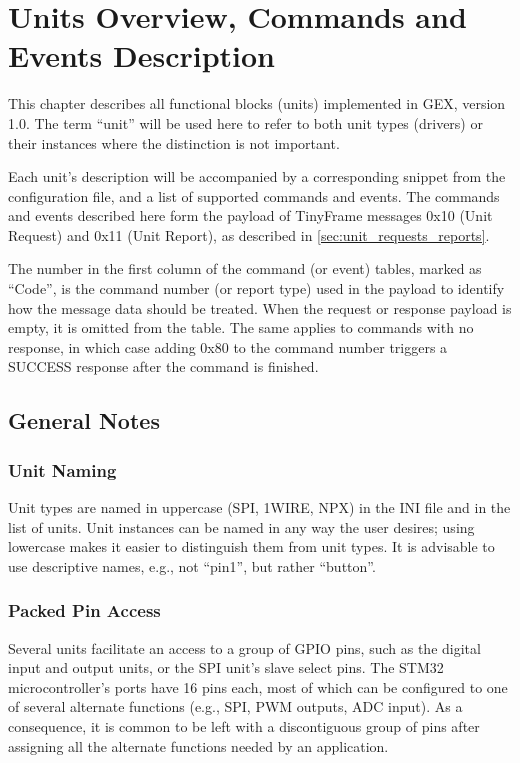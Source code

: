 \chapter{Units Overview, Commands and Events Description} \label{sec:units_overview}

This chapter describes all functional blocks (units) implemented in GEX, version 1.0. The term ``unit'' will be used here to refer to both unit types (drivers) or their instances where the distinction is not important.

Each unit's description will be accompanied by a corresponding snippet from the configuration file, and a list of supported commands and events. The commands and events described here form the payload of TinyFrame messages 0x10 (Unit Request) and 0x11 (Unit Report), as described in \cref{sec:unit_requests_reports}.

The number in the first column of the command (or event) tables, marked as ``Code'', is the command number (or report type) used in the payload to identify how the message data should be treated. When the request or response payload is empty, it is omitted from the table. The same applies to commands with no response, in which case adding 0x80 to the command number triggers a SUCCESS response after the command is finished.

\section{General Notes}

\subsection{Unit Naming}

Unit types are named in uppercase (SPI, 1WIRE, NPX) in the INI file and in the list of units. Unit instances can be named in any way the user desires; using lowercase makes it easier to distinguish them from unit types. It is advisable to use descriptive names, e.g., not ``pin1'', but rather ``button''.

\subsection{Packed Pin Access} \label{sec:packedpins}

Several units facilitate an access to a group of GPIO pins, such as the digital input and output units, or the SPI unit's slave select pins. The STM32 microcontroller's ports have 16 pins each, most of which can be configured to one of several alternate functions (e.g., SPI, PWM outputs, ADC input). As a consequence, it is common to be left with a discontiguous group of pins after assigning all the alternate functions needed by an application.

